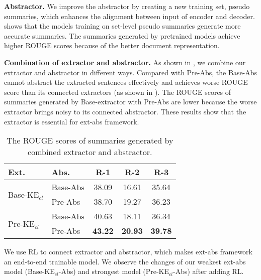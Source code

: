 \textbf{Abstractor.}
We improve the abstractor by creating a new training set, pseudo summaries, 
which enhances the alignment between input of encoder and decoder.
 shows that
the models training on set-level pseudo summaries
generate more accurate summaries.
The summaries generated by pretrained models achieve higher ROUGE scores
because of the better document representation.

\textbf{Combination of extractor and abstractor.}
As shown in , we combine our extractor
and abstractor in different ways.
Compared with Pre-Abs,
the Base-Abs cannot abstract the extracted sentences effectively
and achieves worse ROUGE score than its connected extractors (as shown in ).
The ROUGE scores of summaries generated by Base-extractor with Pre-Abs are lower 
because the worse extractor brings noisy to its connected abstractor.
These results show that
the extractor is essential for ext-abs framework.

\begin{table}[ht!]
	\centering
	\scriptsize
	\begin{tabular}{|l|l|c|c|c|}
		\hline
		Ext. & Abs. & R-1 & R-2 & R-3\\
		\hline
		\multirow{2}{*}{Base-KE$_{cl}$} &Base-Abs & 38.09 & 16.61 & 35.64\\ 
		\cline{2-5}
		~  &  Pre-Abs & 38.70 & 19.27 & 36.23 \\
		\hline
		\multirow{2}{*}{Pre-KE$_{cl}$} &Base-Abs & 40.63 & 18.11 & 36.34 \\ 
		\cline{2-5}
		~  &  Pre-Abs & \bf 43.22 & \bf 20.93 & \bf 39.78 \\
		\hline
	\end{tabular}
	\caption{The ROUGE scores of summaries generated by combined extractor and abstractor.}
	\label{tab:extabs}
\end{table}

We use RL to connect extractor and abstractor,
which makes ext-abs framework an end-to-end trainable model.
We observe the changes of our weakest ext-abs model (Base-KE$_{cl}$-Abs)
and strongest model (Pre-KE$_{cl}$-Abs) after adding RL.

